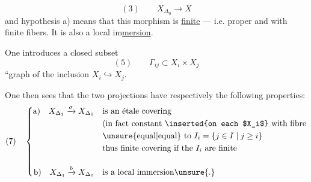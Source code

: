 \[
(3)\qquad X_{\Delta_0}\longrightarrow X
\]
and hypothesis a) means that this
morphism  is \uline{finite} --- i.e. proper
 and with finite fibers. It is also a
local im\uline{mersion}.

One introduces a closed subset
\[
(5)\qquad \Gamma_{ij}\subset X_i\times X_j
\]
``graph of the inclusion $X_i\hookrightarrow X_j$.

One then sees that the two projections
have respectively the following properties:
\[
(7)\quad\left\{\begin{aligned}
\text{a)}\quad X_{\Delta_1}\xrightarrow{\sigma}X_{\Delta_0}&\quad\text{is an étale covering}\\
&\quad\text{(in fact constant \inserted{on each $X_i$} with fibre}\\
&\quad\text{\unsure{equal|equal} to }I_i=\{j\in I\mid j\geq i\}\\
&\quad\text{thus finite covering if the }I_i\text{ are finite}\\[1em]
\text{b)}\quad X_{\Delta_1}\xrightarrow{b}X_{\Delta_0}&\quad\text{is a local immersion\unsure{.}}
\end{aligned}\right.
\]
